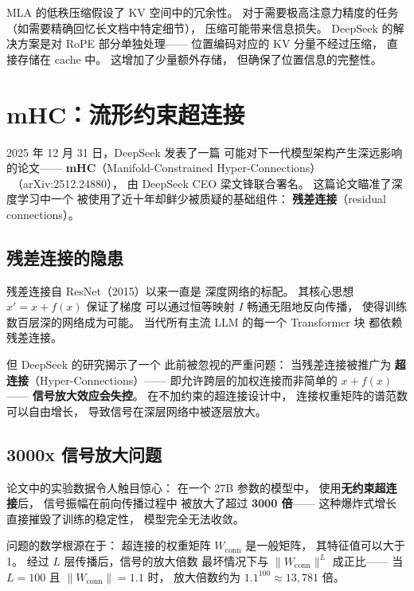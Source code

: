 \begin{warnbox}
MLA 的低秩压缩假设了 KV 空间中的冗余性。
对于需要极高注意力精度的任务
（如需要精确回忆长文档中特定细节），
压缩可能带来信息损失。
DeepSeek 的解决方案是对 RoPE 部分单独处理——
位置编码对应的 KV 分量不经过压缩，
直接存储在 cache 中。
这增加了少量额外存储，
但确保了位置信息的完整性。
\end{warnbox}

\section{mHC：流形约束超连接}
\label{sec:mhc}

2025 年 12 月 31 日，DeepSeek 发表了一篇
可能对下一代模型架构产生深远影响的论文——
\textbf{mHC}（Manifold-Constrained Hyper-Connections）
~\cite{mhc2025}（arXiv:2512.24880），
由 DeepSeek CEO 梁文锋联合署名。
这篇论文瞄准了深度学习中一个
被使用了近十年却鲜少被质疑的基础组件：
\textbf{残差连接}（residual connections）。

\subsection{残差连接的隐患}

残差连接自 ResNet（2015）以来一直是
深度网络的标配。
其核心思想 $x' = x + f(x)$ 保证了梯度
可以通过恒等映射 $I$ 畅通无阻地反向传播，
使得训练数百层深的网络成为可能。
当代所有主流 LLM 的每一个 Transformer 块
都依赖残差连接。

但 DeepSeek 的研究揭示了一个
此前被忽视的严重问题：
当残差连接被推广为
\textbf{超连接}（Hyper-Connections）——
即允许跨层的加权连接而非简单的 $x + f(x)$——
\textbf{信号放大效应会失控}。
在不加约束的超连接设计中，
连接权重矩阵的谱范数可以自由增长，
导致信号在深层网络中被逐层放大。

\subsection{3000x 信号放大问题}

论文中的实验数据令人触目惊心：
在一个 27B 参数的模型中，
使用\textbf{无约束超连接}后，
信号振幅在前向传播过程中
被放大了超过 \textbf{3000 倍}——
这种爆炸式增长直接摧毁了训练的稳定性，
模型完全无法收敛。

问题的数学根源在于：
超连接的权重矩阵 $W_{\mathrm{conn}}$ 是一般矩阵，
其特征值可以大于 1。
经过 $L$ 层传播后，信号的放大倍数
最坏情况下与 $\|W_{\mathrm{conn}}\|^L$ 成正比——
当 $L = 100$ 且 $\|W_{\mathrm{conn}}\| = 1.1$ 时，
放大倍数约为 $1.1^{100} \approx 13{,}781$ 倍。

